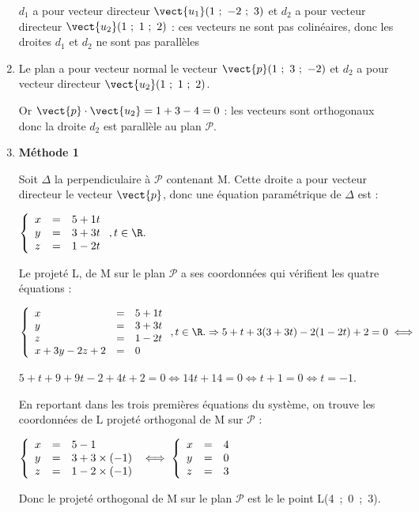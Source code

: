 \begin{enumerate}
$d_1$ a pour vecteur directeur $\vect{u_1}(1~;~-2~;~3)$ et $d_2$ a pour vecteur directeur $\vect{u_2}(1~;~1~;~2)$ : ces vecteurs ne sont pas colinéaires, donc les droites $d_1$ et $d_2$ ne sont pas parallèles 
\item %

Le plan a pour vecteur normal le vecteur $\vect{p}(1~;~3~;~-2)$ et $d_2$ a pour vecteur directeur $\vect{u_2}(1~;~1~;~2)$.

Or $\vect{p} \cdot \vect{u_2} =  1 + 3 - 4 = 0$ : les vecteurs sont orthogonaux donc la droite $d_2$ est parallèle au plan $\mathcal P$.
\item %
\textbf{Méthode 1}

Soit $\Delta$ la perpendiculaire à $\mathcal P$ contenant M. Cette droite a pour vecteur directeur le vecteur $\vect{p}$, donc une équation paramétrique de $\Delta$ est :

$\left\{\begin{array}{l c l}
x	&=&5 + 1t\\
y 	&=&3 + 3t\\
z	&=&1 - 2t\\
\end{array}\right., t \in \R.$

Le projeté L,  de M sur le plan $\mathcal P$ a ses coordonnées qui vérifient les quatre équations :

$\left\{\begin{array}{l c l}
x	&=&5 + 1t\\
y 	&=&3 + 3t\\
z	&=&1 - 2t\\
x + 3y - 2z + 2&=&0
\end{array}\right. , t \in \R. \Rightarrow 5 + t  + 3(3 + 3t) - 2(1 - 2t) + 2 = 0 \iff$

$5 + t + 9 + 9t - 2 + 4t + 2 = 0 \iff 14t  + 14 = 0 \iff t + 1 = 0 \iff t = - 1$.

En reportant dans les trois premières équations du système, on trouve les coordonnées de L projeté orthogonal de M sur $\mathcal P$ :

$\left\{\begin{array}{l c l}
x	&=&5 - 1\\
y 	&=&3 + 3\times (- 1)\\
z	&=&1 - 2\times (- 1)\\
\end{array}\right. \iff \left\{\begin{array}{l c l}
x	&=&4\\
y 	&=&0\\
z	&=&3\\
\end{array}\right.$

Donc le projeté orthogonal de M sur le plan $\mathcal P$ est le le point L(4~;~0~;~3).
\end{enumerate}

